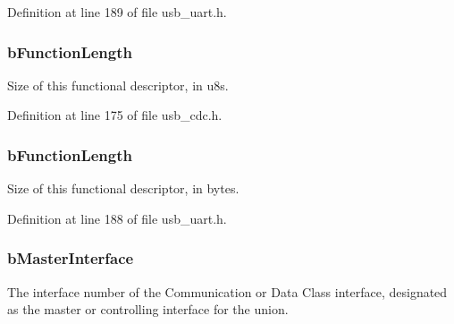 Definition at line 189 of file usb\-\_\-uart.\-h.

\hypertarget{struct_u_s_b___union___functional___descriptor_a26c0bc44674a4154a958ce07a0d5b0fd}{
\subsubsection[{b\-Function\-Length}]{ b\-Function\-Length}}\label{struct_u_s_b___union___functional___descriptor_a26c0bc44674a4154a958ce07a0d5b0fd}
Size of this functional descriptor, in u8s. 

Definition at line 175 of file usb\-\_\-cdc.\-h.

\hypertarget{struct_u_s_b___union___functional___descriptor_a2d45c545dca79b1a912a7fa0e8d3a691}{
\subsubsection[{b\-Function\-Length}]{ b\-Function\-Length}}\label{struct_u_s_b___union___functional___descriptor_a2d45c545dca79b1a912a7fa0e8d3a691}
Size of this functional descriptor, in bytes. 

Definition at line 188 of file usb\-\_\-uart.\-h.

\hypertarget{struct_u_s_b___union___functional___descriptor_aa6c02ce2914ff851df5c3ac40bc4bba7}{
\subsubsection[{b\-Master\-Interface}]{ b\-Master\-Interface}}\label{struct_u_s_b___union___functional___descriptor_aa6c02ce2914ff851df5c3ac40bc4bba7}
The interface number of the Communication or Data Class interface, designated as the master or controlling interface for the union. 

